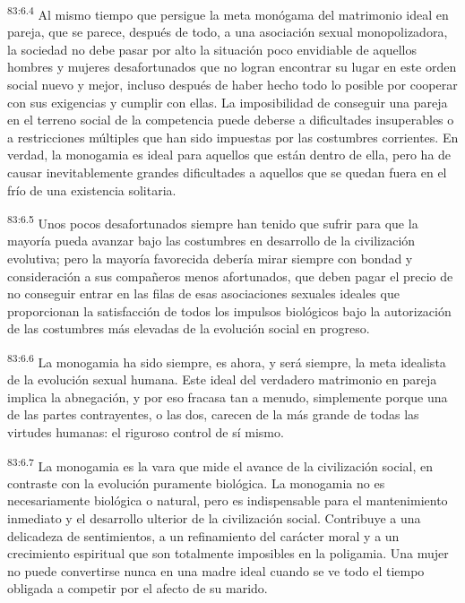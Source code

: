 \par
\textsuperscript{83:6.4} Al mismo tiempo que persigue la meta monógama del matrimonio ideal en pareja, que se parece, después de todo, a una asociación sexual monopolizadora, la sociedad no debe pasar por alto la situación poco envidiable de aquellos hombres y mujeres desafortunados que no logran encontrar su lugar en este orden social nuevo y mejor, incluso después de haber hecho todo lo posible por cooperar con sus exigencias y cumplir con ellas. La imposibilidad de conseguir una pareja en el terreno social de la competencia puede deberse a dificultades insuperables o a restricciones múltiples que han sido impuestas por las costumbres corrientes. En verdad, la monogamia es ideal para aquellos que están dentro de ella, pero ha de causar inevitablemente grandes dificultades a aquellos que se quedan fuera en el frío de una existencia solitaria.

\par
\textsuperscript{83:6.5} Unos pocos desafortunados siempre han tenido que sufrir para que la mayoría pueda avanzar bajo las costumbres en desarrollo de la civilización evolutiva; pero la mayoría favorecida debería mirar siempre con bondad y consideración a sus compañeros menos afortunados, que deben pagar el precio de no conseguir entrar en las filas de esas asociaciones sexuales ideales que proporcionan la satisfacción de todos los impulsos biológicos bajo la autorización de las costumbres más elevadas de la evolución social en progreso.

\par
\textsuperscript{83:6.6} La monogamia ha sido siempre, es ahora, y será siempre, la meta idealista de la evolución sexual humana. Este ideal del verdadero matrimonio en pareja implica la abnegación, y por eso fracasa tan a menudo, simplemente porque una de las partes contrayentes, o las dos, carecen de la más grande de todas las virtudes humanas: el riguroso control de sí mismo.

\par
\textsuperscript{83:6.7} La monogamia es la vara que mide el avance de la civilización social, en contraste con la evolución puramente biológica. La monogamia no es necesariamente biológica o natural, pero es indispensable para el mantenimiento inmediato y el desarrollo ulterior de la civilización social. Contribuye a una delicadeza de sentimientos, a un refinamiento del carácter moral y a un crecimiento espiritual que son totalmente imposibles en la poligamia. Una mujer no puede convertirse nunca en una madre ideal cuando se ve todo el tiempo obligada a competir por el afecto de su marido.

